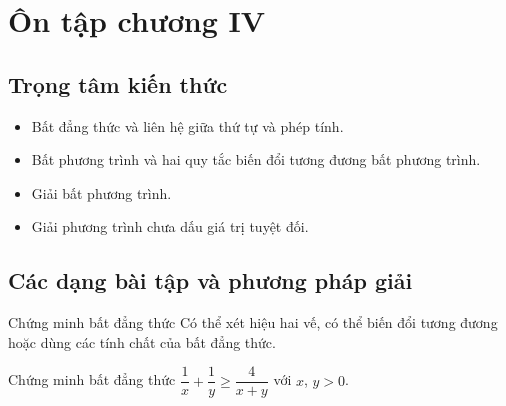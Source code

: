 \section{Ôn tập chương IV}
\subsection{Trọng tâm kiến thức}

\begin{itemize}
	\item Bất đẳng thức và liên hệ giữa thứ tự và phép tính.
	\item Bất phương trình và hai quy tắc biến đổi tương đương bất phương trình.
	\item Giải bất phương trình.
	\item Giải phương trình chưa dấu giá trị tuyệt đối.
\end{itemize}

\subsection{Các dạng bài tập và phương pháp giải}

\begin{dang}{Chứng minh bất đẳng thức}
	Có thể xét hiệu hai vế, có thể biến đổi tương đương hoặc dùng các tính chất của bất đẳng thức.
\end{dang}

\begin{vd}%
	Chứng minh bất đẳng thức $\dfrac{1}{x} + \dfrac{1}{y} \ge \dfrac{4}{x+y}$ với $x$, $y > 0$.
\end{vd}

